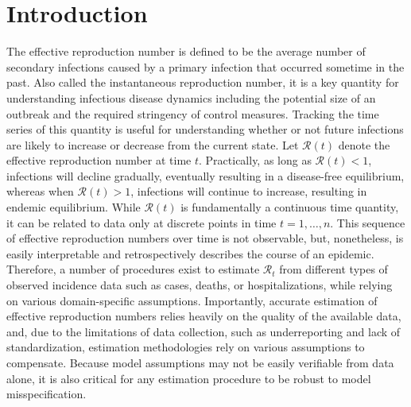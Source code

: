 \documentclass[10pt,letterpaper]{article}
\def\calR{\mathcal{R}}
\begin{document}
\linenumbers

\section{Introduction}
\label{sec:intro}

The effective reproduction number is defined to be the average number of
secondary infections caused by a primary infection that occurred sometime in the past.
Also called the instantaneous reproduction number, it is a key quantity
for understanding infectious disease dynamics including the potential size of an
outbreak and the required stringency of control measures.  Tracking the time
series of this quantity is useful for understanding whether or not
future infections are likely to increase or decrease from the current state. Let
$\calR(t)$ denote the effective reproduction number at time $t$. Practically, as
long as $\calR(t) < 1$, infections will decline gradually, eventually resulting
in a disease-free equilibrium, whereas when $\calR(t) > 1$, infections will
continue to increase, resulting in endemic equilibrium. While $\calR(t)$ is
fundamentally a continuous time quantity, it can be related to data only at
discrete points in time $t = 1,\ldots,n$. This sequence of effective
reproduction numbers over time is not observable, but, nonetheless, is easily
interpretable and retrospectively describes the course of an epidemic.
Therefore, a number of procedures exist to estimate $\calR_t$ from different
types of observed incidence data such as cases, deaths, or hospitalizations,
while relying on various domain-specific assumptions. Importantly, accurate
estimation of effective reproduction numbers relies heavily on the quality of
the available data, and, due to the limitations of data collection, such as
underreporting and lack of standardization, estimation methodologies rely on
various assumptions to compensate. Because model assumptions may not be easily
verifiable from data alone, it is also critical for any estimation procedure to
be robust to model misspecification. 
\end{document}
